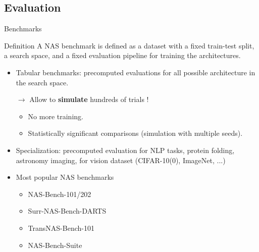 \documentclass[aspectratio=169,xcolor=dvipsnames]{beamer}
\begin{document}
\subsection{Evaluation}
\begin{frame}{Benchmarks}
    \begin{block}{Definition}
        A NAS benchmark is defined as a dataset with a fixed train-test split, a search space, and a fixed evaluation pipeline for training the architectures.
    \end{block}
    \begin{itemize}
        \item Tabular benchmarks: precomputed evaluations for all possible architecture in the search space.
        \item [$\rightarrow$] Allow to \textbf{simulate} hundreds of trials !\begin{itemize}
            \item No more training.
            \item Statistically significant comparisons (simulation with multiple seeds).
        \end{itemize}
        \item Specialization: precomputed evaluation for NLP tasks, protein folding, astronomy imaging, for vision dataset (CIFAR-10(0), ImageNet, ...)
        \item Most popular NAS benchmarks \begin{itemize}
            \item NAS-Bench-101/202
            \item Surr-NAS-Bench-DARTS
            \item TransNAS-Bench-101
            \item NAS-Bench-Suite
        \end{itemize}
    \end{itemize}
\end{frame}
\end{document}
